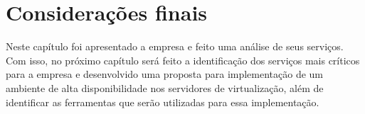 
\section{Considerações finais}

Neste capítulo foi apresentado a empresa e feito uma análise de seus serviços. Com isso, no próximo capítulo será feito a identificação dos 
serviços mais críticos para a empresa e desenvolvido uma proposta para implementação de um ambiente de alta disponibilidade nos servidores 
de virtualização, além de identificar as ferramentas que serão utilizadas para essa implementação.



